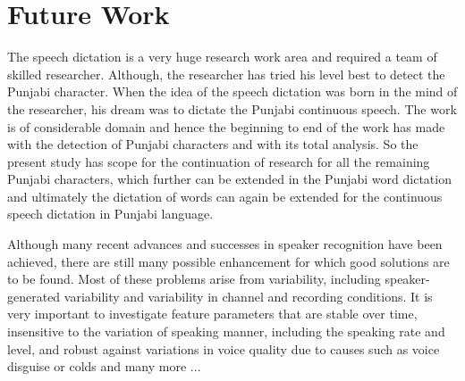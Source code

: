 \documentclass[12pt,a4paper,oneside]{memoir}
\begin{document}
\section{Future Work}

The speech dictation is a very huge research work area and required a team of skilled
researcher. Although, the researcher has tried his level best to detect the Punjabi
character. When the idea of the speech dictation was born in the mind of the
researcher, his dream was to dictate the Punjabi continuous speech. The work is of
considerable domain and hence the beginning to end of the work has made with the
detection of Punjabi characters and with its total analysis. So the present study has scope for the
continuation of research for all the remaining Punjabi characters, which further can
be extended in the Punjabi word dictation and ultimately the dictation of words can
again be extended for the continuous speech dictation in Punjabi language.

Although many recent advances and successes in speaker recognition have been
achieved, there are still many possible enhancement for which good solutions are to
be found. Most of these problems arise from variability, including speaker-generated
variability and variability in channel and recording conditions. It is very important to
investigate feature parameters that are stable over time, insensitive to the variation of
speaking manner, including the speaking rate and level, and robust against variations
in voice quality due to causes such as voice disguise or colds and many more ...












\end{document}
